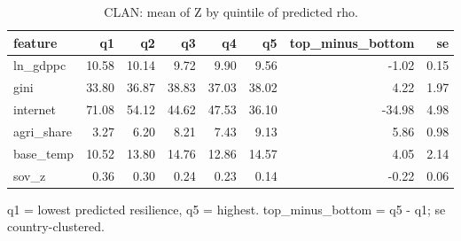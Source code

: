 \begin{table}[htbp]
\centering
\caption{CLAN: mean of Z by quintile of predicted rho.}
\label{tab:clan}
\begin{tabular}{lrrrrrrr}
\toprule
feature & q1 & q2 & q3 & q4 & q5 & top\_minus\_bottom & se \\
\midrule
ln\_gdppc & 10.58 & 10.14 & 9.72 & 9.90 & 9.56 & -1.02 & 0.15 \\
gini & 33.80 & 36.87 & 38.83 & 37.03 & 38.02 & 4.22 & 1.97 \\
internet & 71.08 & 54.12 & 44.62 & 47.53 & 36.10 & -34.98 & 4.98 \\
agri\_share & 3.27 & 6.20 & 8.21 & 7.43 & 9.13 & 5.86 & 0.98 \\
base\_temp & 10.52 & 13.80 & 14.76 & 12.86 & 14.57 & 4.05 & 2.14 \\
sov\_z & 0.36 & 0.30 & 0.24 & 0.23 & 0.14 & -0.22 & 0.06 \\
\bottomrule
\end{tabular}
\par\smallskip\footnotesize q1 = lowest predicted resilience, q5 = highest. top\_minus\_bottom = q5 - q1; se country-clustered.
\end{table}
